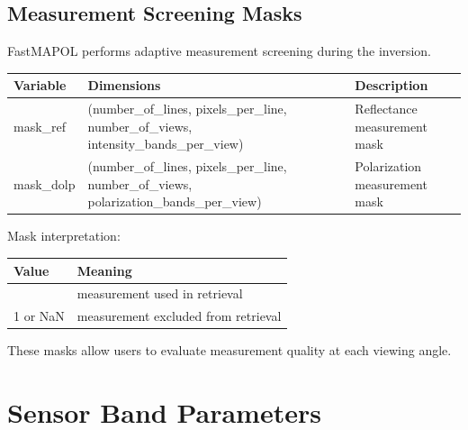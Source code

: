 \documentclass[
  letterpaper,
  open=any]{scrbook}
\begin{document}
\subsection{Measurement Screening
Masks}\label{measurement-screening-masks}

FastMAPOL performs adaptive measurement screening during the inversion.

\begin{longtable}[]{@{}
  >{\raggedright\arraybackslash}p{}
  >{\raggedright\arraybackslash}p{}
  >{\raggedright\arraybackslash}p{}@{}}
\toprule\noalign{}
\begin{minipage}[b]{\linewidth}\raggedright
Variable
\end{minipage} & \begin{minipage}[b]{\linewidth}\raggedright
Dimensions
\end{minipage} & \begin{minipage}[b]{\linewidth}\raggedright
Description
\end{minipage} \\
\midrule\noalign{}
\endhead
\bottomrule\noalign{}
\endlastfoot
mask\_ref & (number\_of\_lines, pixels\_per\_line, number\_of\_views,
intensity\_bands\_per\_view) & Reflectance measurement mask \\
mask\_dolp & (number\_of\_lines, pixels\_per\_line, number\_of\_views,
polarization\_bands\_per\_view) & Polarization measurement mask \\
\end{longtable}

Mask interpretation:

\begin{longtable}[]{@{}ll@{}}
\toprule\noalign{}
Value & Meaning \\
\midrule\noalign{}
\endhead
\bottomrule\noalign{}
\endlastfoot
0 & measurement used in retrieval \\
1 or NaN & measurement excluded from retrieval \\
\end{longtable}

These masks allow users to evaluate measurement quality at each viewing
angle.

\section{Sensor Band Parameters}\label{sensor-band-parameters}
\end{document}
